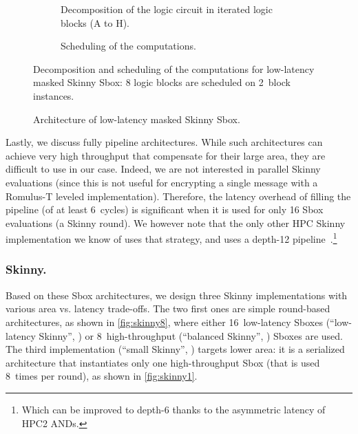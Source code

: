 \documentclass{llncs}
\begin{document}
\begin{figure}
    \begin{subfigure}[b]{.48\textwidth}
        \centering
        
        \caption{%
            Decomposition of the logic circuit in iterated logic blocks (A to H).
        }
        \label{fig:sboxcolored}
    \end{subfigure}
    \hfill
    \begin{subfigure}[b]{.48\textwidth}
        \centering
        
        \caption{%
            Scheduling of the computations.
        }
        \label{fig:signal}
    \end{subfigure}
    \caption{%
        Decomposition and scheduling of the computations for low-latency masked
        Skinny Sbox: 8 logic blocks are scheduled on 2~block instances.
    }
    \label{fig:sbox_opt}
\end{figure}

\begin{figure}
    \centering
    
    \caption{%
        Architecture of low-latency masked Skinny Sbox.
    }
    \label{fig:sboxopt_circuit}
    \label{fig:sbox}
\end{figure}

Lastly, we discuss fully pipeline architectures.
While such architectures can achieve very high throughput that compensate for
their large area, they are difficult to use in our case.
Indeed, we are not interested in parallel Skinny evaluations (since this is not
useful for encrypting a single message with a Romulus-T leveled
implementation). Therefore, the latency
overhead of filling the pipeline (of at least 6~cycles) is significant when it
is used for only 16 Sbox evaluations (a Skinny round).
We however note that the only other HPC Skinny implementation we
know of uses that strategy, and uses a depth-12 pipeline~\cite{khairallahhardware}.\footnote{%
    Which can be improved to depth-6 thanks to the asymmetric
    latency of HPC2 ANDs.
}

\subsubsection{Skinny.}\label{subsub:skinny}

Based on these Sbox architectures, we design three Skinny implementations with
various area vs. latency trade-offs.
The two first ones are simple round-based architectures, as shown in
\autoref{fig:skinny8}, where either 16~low-latency Sboxes (``low-latency
Skinny'', \skinnyll) or 8~high-throughput (``balanced Skinny'', \skinnyb)
Sboxes are used.
The third implementation (``small Skinny'', \skinnys) targets lower area: it is
a serialized architecture that instantiates only one high-throughput Sbox (that
is used 8~times per round), as shown in \autoref{fig:skinny1}.
\end{document}
